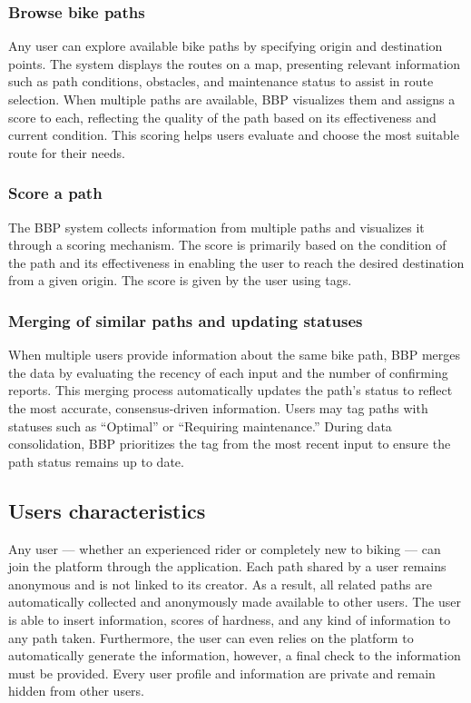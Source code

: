 \subsubsection*{Browse bike paths}

Any user can explore available bike paths by specifying origin and destination points. The system displays the routes on a map, presenting relevant information such as path conditions, obstacles, and maintenance status to assist in route selection. When multiple paths are available, BBP visualizes them and assigns a score to each, reflecting the quality of the path based on its effectiveness and current condition. This scoring helps users evaluate and choose the most suitable route for their needs.

\subsubsection*{Score a path}

The BBP system collects information from multiple paths and visualizes it through a scoring mechanism. The score is primarily based on the condition of the path and its effectiveness in enabling the user to reach the desired destination from a given origin. The score is given by the user using tags.

\subsubsection*{Merging of similar paths and updating statuses}

When multiple users provide information about the same bike path, BBP merges the data by evaluating the recency of each input and the number of confirming reports. This merging process automatically updates the path’s status to reflect the most accurate, consensus-driven information. Users may tag paths with statuses such as “Optimal” or “Requiring maintenance.” During data consolidation, BBP prioritizes the tag from the most recent input to ensure the path status remains up to date.


\subsection{Users characteristics}

Any user — whether an experienced rider or completely new to biking — can join the platform through the application. Each path shared by a user remains anonymous and is not linked to its creator. As a result, all related paths are automatically collected and anonymously made available to other users. The user is able to insert information, scores of hardness, and any kind of information to any path taken. Furthermore, the user can even relies on the platform to automatically generate the information, however, a final check to the information must be provided. Every user profile and information are private and remain hidden from other users.

